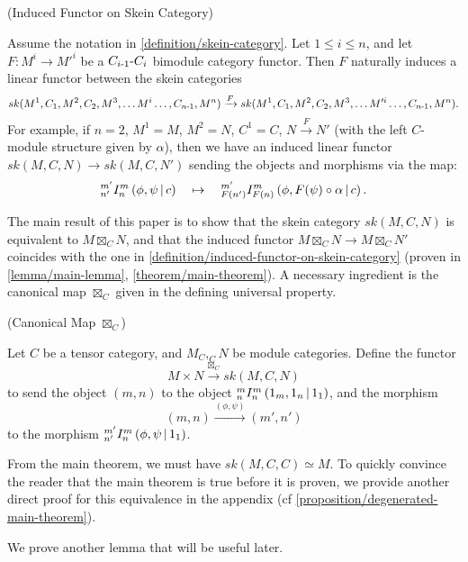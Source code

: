 \begin{definition} \label{definition/induced-functor-on-skein-category} (Induced Functor on Skein Category)

  \noindent Assume the notation in \ref{definition/skein-category}. Let
  $1 \leq i \leq n$, and let $F: M^{i} \to M'^{i}$ be a
  $C_{i{\text -}1}{\text -}C_{i}$ bimodule category functor. \quad Then $F$
  naturally induces a linear functor between the skein categories
  \[
    sk(M^{1}, C_{1}, M^{2}, C_{2}, M^{3}, \ldots M^{i} \ldots, C_{n{\text -}1}, M^{n})
    \xrightarrow{F}
    sk(M^{1}, C_{1}, M^{2}, C_{2}, M^{3}, \ldots M'^{i} \ldots, C_{n{\text -}1}, M^{n}).
  \]
  For example, if $n=2$, $M^{1} = M$, $M^{2} = N$, $C^{1} = C$, $N \xrightarrow{F} N'$
  (with the left $C$-module structure given by $\alpha$), then we have an
  induced linear functor $sk(M,C,N) \to sk(M,C,N')$ sending the objects and morphisms via the map:
  \[
    {}^{m'}_{n'} I^{m}_{n} \left( \phi, \psi \,\middle|\, c \right)
    \quad \mapsto \quad
    {}^{m'}_{F(n')} I^{m}_{F(n)} \left( \phi, F(\psi) \circ \alpha \,\middle|\, c \right).
  \]
\end{definition}

\noindent The main result of this paper is to show that the skein category
$sk(M,C,N)$ is equivalent to $M \boxtimes_{C} N$, and that the induced functor $M \boxtimes_{C} N \to M \boxtimes_{C} N'$
coincides with the one in \ref{definition/induced-functor-on-skein-category}
(proven in \ref{lemma/main-lemma}, \ref{theorem/main-theorem}). A necessary
ingredient is the canonical map $\boxtimes_{C}$ given in the defining universal
property.

\begin{definition}\label{definition/canonical-map} (Canonical Map $\boxtimes_{C}$)

  \noindent Let $C$ be a tensor category, and $M_{C}, _{C}N$ be module
  categories. \quad Define the functor
  \[
    M \times N \xrightarrow{\boxtimes_{C}} sk(M,C,N)
  \]
  to send the object $(m,n)$ to the object ${}^{m}_{n} I^{m}_{n} \left( 1_{m}, 1_{n} \,\middle|\, 1_{1} \right)$, and the morphism
  \[
    (m,n) \xrightarrow{(\phi, \psi)} (m', n')
  \]
  to the morphism ${}^{m'}_{n'} I^{m}_{n} \left( \phi, \psi \,\middle|\, 1_{1} \right)$.
\end{definition}

\noindent From the main theorem, we must have $sk(M,C,C) \simeq M$. To quickly
convince the reader that the main theorem is true before it is proven, we
provide another direct proof for this equivalence in the appendix (cf
\ref{proposition/degenerated-main-theorem}).

\hfill\break
\noindent We prove another lemma that will be useful later.

